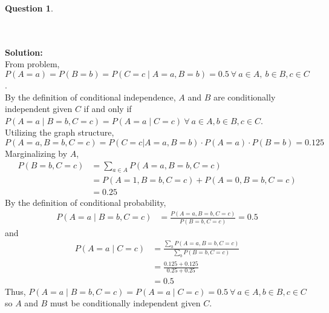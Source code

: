 \documentclass{article}
\theoremstyle{definition}
\newtheorem{question}[thm]{Question}
\begin{document}
\begin{question}
\begin{enumerate}[label=\alph*)]
        \\ \\
        \noindent \textbf{Solution: }\\From problem, $P(A=a) = P(B=b) = P(C=c \mid A=a,B=b) = 0.5\  \forall\ a \in A,\ b\in B, c \in C$. \\By the definition of conditional independence, $A$ and $B$ are conditionally independent given $C$ if and only if $P(A = a \mid B = b, C = c) = P(A = a \mid C = c)\ \forall\ a \in A, b \in B, c \in C$. \\Utilizing the graph structure,
        \begin{equation*}
            P (A = a, B = b, C = c) = P (C = c | A = a, B = b) \cdot P (A = a) \cdot P (B = b) = 0.125
        \end{equation*}
        Marginalizing by $A$,
        \begin{align*}
            P(B=b,C=c) &= \sum_{a \in A}P(A=a,B=b,C=c)\\
            &= P(A=1,B=b,C=c) + P(A=0,B=b,C=c)\\
            &= 0.25
        \end{align*}
        By the definition of conditional probability,
        \begin{align*}
            P(A = a \mid B = b, C = c) &= \frac{P (A = a, B = b, C = c)}{P(B=b,C=c)} = 0.5
        \end{align*}
        and
        \begin{align*}
            P(A = a \mid C = c) &= \frac{\sum_{b}P (A = a, B = b, C = c)}{\sum_{b}P(B=b,C=c)}\\ 
            &= \frac{0.125 + 0.125}{0.25 + 0.25}\\
            &= 0.5
        \end{align*}
        Thus, $P(A = a \mid B = b, C = c) = P(A = a \mid C = c) = 0.5\ \forall\ a \in A, b \in B, c \in C$ so $A$ and $B$ must be conditionally independent given $C$.
    \end{enumerate}
\end{question}

\clearpage
\end{document}
